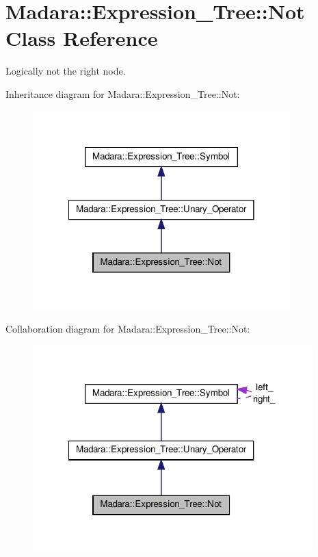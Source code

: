 \hypertarget{classMadara_1_1Expression__Tree_1_1Not}{
\section{Madara::Expression\_\-Tree::Not Class Reference}
\label{dc/dea/classMadara_1_1Expression__Tree_1_1Not}
}


Logically not the right node.  




Inheritance diagram for Madara::Expression\_\-Tree::Not:
\nopagebreak
\begin{figure}[H]
\begin{center}
\leavevmode
\includegraphics[width=282pt]{db/d1e/classMadara_1_1Expression__Tree_1_1Not__inherit__graph}
\end{center}
\end{figure}


Collaboration diagram for Madara::Expression\_\-Tree::Not:
\nopagebreak
\begin{figure}[H]
\begin{center}
\leavevmode
\includegraphics[width=307pt]{d5/dbc/classMadara_1_1Expression__Tree_1_1Not__coll__graph}
\end{center}
\end{figure}
